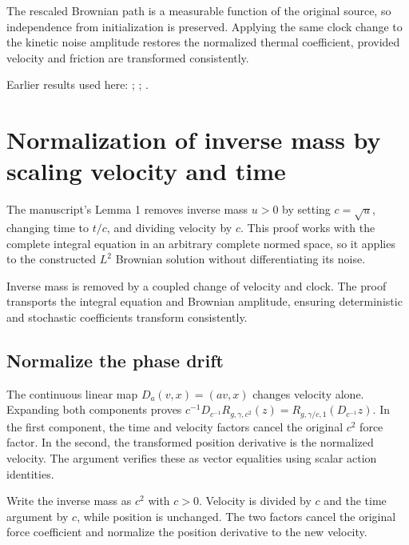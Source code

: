 \documentclass[11pt,a4paper]{report}
\begin{document}
The rescaled Brownian path is a measurable function of the original source, so independence from initialization is preserved. Applying the same clock change to the kinetic noise amplitude restores the normalized thermal coefficient, provided velocity and friction are transformed consistently.



Earlier results used here: \cite[Section~3.8.16]{LangevinLean2026ULASC}; \cite[Section~3.8.17]{LangevinLean2026ULASC}; \cite[Section~3.8.20]{LangevinLean2026ULASC}.
\section{\texorpdfstring{Normalization of inverse mass by scaling velocity and time}{Normalization of inverse mass by scaling velocity and time}}
\label{proof-module-KineticLangevin-MassScaling-lean}


The manuscript’s Lemma 1 removes inverse mass \(u>0\) by setting \(c=\sqrt u\), changing time to \(t/c\), and dividing velocity by \(c\). This proof works with the complete integral equation in an arbitrary complete normed space, so it applies to the constructed \(L^{2}\) Brownian solution without differentiating its noise.



Inverse mass is removed by a coupled change of velocity and clock. The proof transports the integral equation and Brownian amplitude, ensuring deterministic and stochastic coefficients transform consistently.

\subsection{\texorpdfstring{Normalize the phase drift}{Normalize the phase drift}}
\label{report-step-KineticLangevin-MassScaling-lean-1}


The continuous linear map \(D_a(v,x)=(av,x)\) changes velocity alone. Expanding both components proves \(c^{-1}D_{c^{-1}}R_{g,\gamma,c^2}(z)=R_{g,\gamma/c,1}(D_{c^{-1}}z)\). In the first component, the time and velocity factors cancel the original \(c^2\) force factor. In the second, the transformed position derivative is the normalized velocity. The argument verifies these as vector equalities using scalar action identities.



Write the inverse mass as \(c^2\) with \(c>0\). Velocity is divided by \(c\) and the time argument by \(c\), while position is unchanged. The two factors cancel the original force coefficient and normalize the position derivative to the new velocity.
\end{document}
